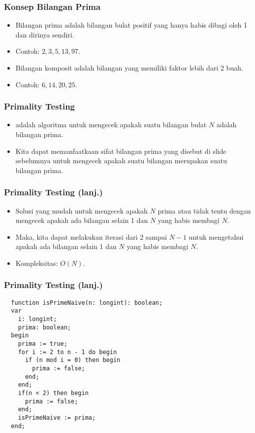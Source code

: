 \begin{frame}
\frametitle{Konsep Bilangan Prima}
\begin{itemize}
  \item Bilangan prima adalah bilangan bulat positif yang hanya habis dibagi oleh 1 dan dirinya sendiri.
  \item Contoh: $2, 3, 5, 13, 97$.
  \item Bilangan komposit adalah bilangan yang memiliki faktor lebih dari 2 buah.
  \item Contoh: $6, 14, 20, 25$.
\end{itemize}
\end{frame}

\begin{frame}
\frametitle{Primality Testing}
\begin{itemize}
  \item {} adalah algoritma untuk mengecek apakah suatu bilangan bulat $N$ adalah bilangan prima.
  \item Kita dapat memanfaatkaan sifat bilangan prima yang disebut di slide sebelumnya untuk mengecek apakah suatu bilangan merupakan suatu bilangan prima. 
\end{itemize}
\end{frame}

\begin{frame}
\frametitle{Primality Testing (lanj.)}
\begin{itemize}
  \item Solusi yang mudah untuk mengecek apakah $N$ prima atau tidak tentu dengan mengecek apakah ada bilangan selain 1 dan $N$ yang habis membagi $N$.
  \item Maka, kita dapat melakukan iterasi dari 2 sampai $N-1$ untuk mengetahui apakah ada bilangan selain 1 dan $N$ yang habis membagi $N$.
  \item Kompleksitas: $O(N)$.
\end{itemize}
\end{frame}

\begin{frame}[fragile]
\frametitle{Primality Testing (lanj.)}
\begin{lstlisting}
  function isPrimeNaive(n: longint): boolean;
  var
    i: longint;
    prima: boolean;
  begin
    prima := true;
    for i := 2 to n - 1 do begin
      if (n mod i = 0) then begin
        prima := false;
      end;
    end;
    if(n < 2) then begin
      prima := false;
    end;
    isPrimeNaive := prima;
  end;  
\end{lstlisting}
\end{frame}


